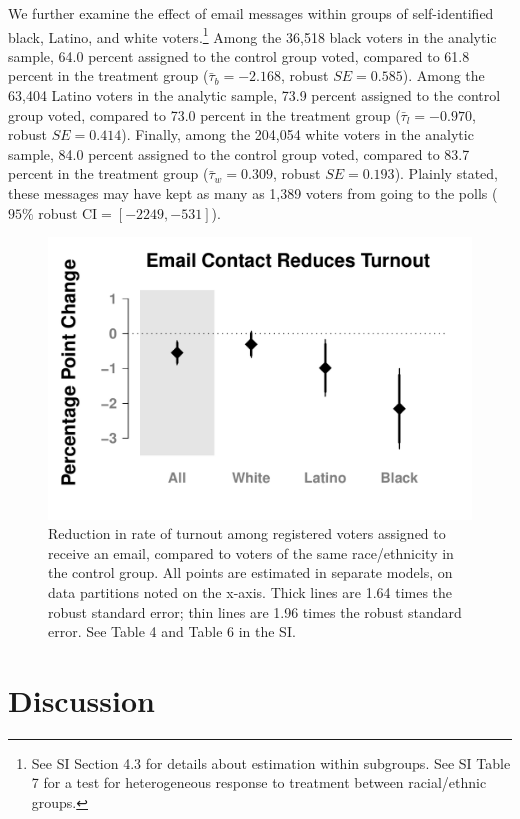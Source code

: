 \documentclass[12pt]{article}
\begin{document}
We further examine the effect of email messages within groups of
self-identified black, Latino, and white voters.\footnote{See SI
  Section 4.3 for details about estimation within subgroups.  See SI
  Table 7 for a test for heterogeneous response to treatment between
  racial/ethnic groups.}  Among the 36,518 black voters in the
analytic sample, 64.0 percent assigned to the control group voted,
compared to 61.8 percent in the treatment group
($\bar{\tau}_{b} = -2.168$, robust $SE = 0.585$). Among the 63,404
Latino voters in the analytic sample, 73.9 percent assigned to the
control group voted, compared to 73.0 percent in the treatment group
($\bar{\tau}_{l} = -0.970$, robust $SE = 0.414$).  Finally, among the
204,054 white voters in the analytic sample, 84.0 percent assigned to
the control group voted, compared to 83.7 percent in the treatment
group ($\bar{\tau}_{w} = 0.309$, robust $SE = 0.193$). Plainly stated,
these messages may have kept as many as 1,389 voters from going to the
polls ($95\%\textrm{ robust CI} = [-2249, -531]$).

\begin{figure}[t]
  \centering
  \includegraphics[width=.75\textwidth]{../tables-figures/subgroup_effects}
  \caption[Subgroup Effect Plot]{Reduction in rate of turnout among
    registered voters assigned to receive an email, compared to voters
    of the same race/ethnicity in the control group. All points are
    estimated in separate models, on data partitions noted on the
    x-axis. Thick lines are 1.64 times the robust standard error; thin
    lines are 1.96 times the robust standard error. See Table 4 and
    Table 6 in the SI. \label{fig:subgroup}}
\end{figure}
  

\section{Discussion}
\end{document}
